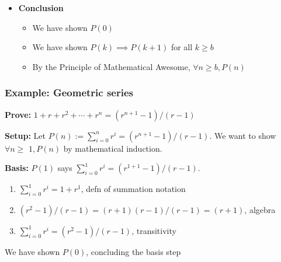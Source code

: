 \begin{frame}
\begin{itemize}
  \item \textbf{Conclusion}
    \begin{itemize}
    \item We have shown $P(0)$
      \pause
    \item We have shown $P(k) \implies P(k+1)$ for all $k \geq b$
      \pause
    \item By the Principle of Mathematical Awesome, $\forall n \geq b, P(n)$
      \pause
    \end{itemize}
    
  \end{itemize}

\end{frame}

\begin{frame}
  \frametitle{Example: Geometric series}

  \textbf{Prove:} $1 + r + r^2 + \dotsb + r^n = (r^{n+1} - 1) / (r - 1)$

  \textbf{Setup:} Let $P(n) := \sum_{i=0}^n r^i = (r^{n+1} - 1) / (r - 1)$. We want to show $\forall n \geq$ \pause $1, P(n)$ by mathematical induction.
  \pause

  \textbf{Basis:} $P(1)$ says $\sum_{i=0}^1 r^i = (r^{1+1} - 1) / (r - 1)$.
  \pause

  \begin{enumerate}
  \item {} $\sum_{i=0}^1 r^i = 1 + r^1$, defn of summation notation
    \pause
  \item {} $(r^2 - 1) / (r-1) = (r+1)(r-1)/(r-1) = (r+1)$, algebra
    \pause
  \item $\sum_{i=0}^1 r^i = (r^2 - 1) / (r-1)$, transitivity
    \pause
  \end{enumerate}

  We have shown $P(0)$, concluding the basis step

\end{frame}

